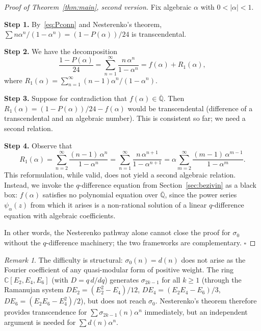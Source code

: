 \documentclass[12pt]{amsart}
\theoremstyle{definition}
\theoremstyle{remark}
\newtheorem{remark}[theorem]{Remark}
\begin{document}
\begin{proof}[Proof of Theorem~\ref{thm:main}, second version]
Fix algebraic $\alpha$ with $0<|\alpha|<1$.

\smallskip\noindent\textbf{Step 1.}
By~\eqref{eq:Pconn} and Nesterenko's theorem,
$\sum n\alpha^n/(1-\alpha^n)=(1-P(\alpha))/24$ is transcendental.

\smallskip\noindent\textbf{Step 2.}
We have the decomposition
\[
  \frac{1-P(\alpha)}{24}
  = \sum_{n=1}^{\infty}\frac{n\,\alpha^n}{1-\alpha^n}
  = f(\alpha) + R_1(\alpha),
\]
where $R_1(\alpha)=\sum_{n=1}^{\infty}(n-1)\alpha^n/(1-\alpha^n)$.

\smallskip\noindent\textbf{Step 3.}
Suppose for contradiction that $f(\alpha)\in\overline{\mathbb{Q}}$.
Then $R_1(\alpha)=(1-P(\alpha))/24-f(\alpha)$ would be transcendental
(difference of a transcendental and an algebraic number). This is
consistent so far; we need a second relation.

\smallskip\noindent\textbf{Step 4.}
Observe that
\[
  R_1(\alpha) = \sum_{n=2}^{\infty}\frac{(n-1)\,\alpha^n}{1-\alpha^n}
  = \sum_{n=1}^{\infty}\frac{n\,\alpha^{n+1}}{1-\alpha^{n+1}}
  = \alpha\sum_{m=2}^{\infty}\frac{(m-1)\,\alpha^{m-1}}{1-\alpha^m}.
\]
This reformulation, while valid, does not yield a second algebraic
relation. Instead, we invoke the $q$-difference equation from
Section~\ref{sec:bezivin} as a black box: $f(\alpha)$ satisfies no
polynomial equation over $\overline{\mathbb{Q}}$, since the power
series $\psi_\alpha(z)$ from which it arises is a non-rational solution
of a linear $q$-difference equation with algebraic coefficients.

In other words, the Nesterenko pathway alone cannot close the proof
for $\sigma_0$ without the $q$-difference machinery; the two
frameworks are complementary. $\square$
\end{proof}

\begin{remark}
The difficulty is structural: $\sigma_0(n)=d(n)$ does not arise as
the Fourier coefficient of any quasi-modular form of positive weight.
The ring $\mathbb{C}[E_2,E_4,E_6]$ (with $D=q\,d/dq$) generates
$\sigma_{2k-1}$ for all $k\ge 1$ (through the Ramanujan system
$DE_2=(E_2^2-E_4)/12$, $DE_4=(E_2 E_4-E_6)/3$,
$DE_6=(E_2 E_6-E_4^2)/2$), but does not reach $\sigma_0$.
Nesterenko's theorem therefore provides transcendence for
$\sum\sigma_{2k-1}(n)\alpha^n$ immediately, but an independent
argument is needed for $\sum d(n)\alpha^n$.
\end{remark}
\end{document}
